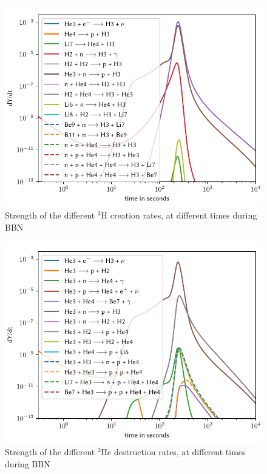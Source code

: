 \begin{figure}[ht]
    \includegraphics[width=5.1in]{figures/app/H3create.pdf}
    \caption{Strength of the different ${}^3$H creation rates, at different times during BBN}
    \label{fig:H3create}
\end{figure}

\begin{figure}[ht]
    \includegraphics[width=5.1in]{figures/app/He3destruct.pdf}
    \caption{Strength of the different ${}^3$He destruction rates, at different times during BBN}
    \label{fig:He3destruct}
\end{figure}

